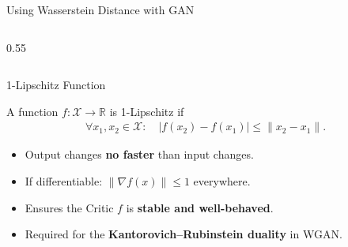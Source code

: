 \documentclass[aspectratio=169,xcolor=dvipsnames,svgnames,x11names,fleqn]{beamer}
\begin{document}
\begin{frame}{Using Wasserstein Distance with GAN}
\begin{columns}[T]
\begin{column}{0.55\textwidth}
\end{column}
    \end{columns}

\end{frame}


\begin{frame}{1-Lipschitz Function}

\footnotesize

\begin{definition}[1-Lipschitz]
A function $f: \mathcal{X} \to \mathbb{R}$ is 1-Lipschitz if
\begin{align*}
\forall x_1, x_2 \in \mathcal{X}: \quad
|f(x_2) - f(x_1)| \le \|x_2 - x_1\|.
\end{align*}
\end{definition}

\vspace{0.3cm}
\begin{itemize}
    \item Output changes \textbf{no faster} than input changes.
    \item If differentiable: $\|\nabla f(x)\| \le 1$ everywhere.  %
    \item Ensures the Critic $f$ is \textbf{stable and well-behaved}.
    \item Required for the \textbf{Kantorovich--Rubinstein duality} in WGAN.
\end{itemize}

\centering
{}

\end{frame}
\end{document}
